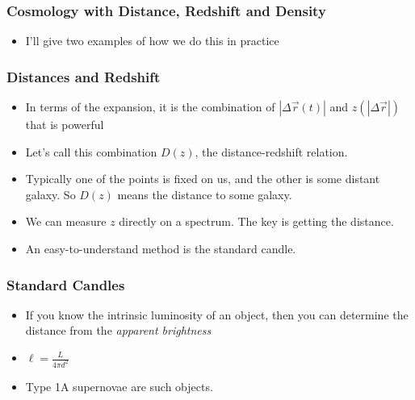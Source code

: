 \documentclass{beamer}
\begin{document}
\frame
{

    \frametitle{Cosmology with Distance, Redshift and Density}


    \begin{itemize}

        \item I'll give two examples of how we do this in practice


    \end{itemize}

}



\frame
{

    \frametitle{Distances and Redshift}


    \begin{itemize}

        \item In terms of the expansion, it is the combination of {\color{gold}
            $|\Delta \vec{r} (t)| $ } and {\color{gold} $z(|\Delta \vec{r}|)$}
            that is powerful


        \item Let's call this combination  {\color{gold} $D(z)$}, the distance-redshift
            relation.

        \item Typically one of the points is fixed on us, and the other is
            some distant galaxy. So {\color{gold} $D(z)$} means the distance
            to some galaxy.

        \item We can measure $z$ directly on a spectrum.  The key is getting
            the distance.

        \item An easy-to-understand method is the standard candle.

    \end{itemize}

}

\frame
{

    \frametitle{Standard Candles}


    \begin{itemize}

        \item If you know the intrinsic luminosity of an object, then you can
            determine the distance from the {\em apparent brightness}

        \item {\color{gold} $\ell = \frac{L}{4 \pi d^2}$ }

        \item Type 1A supernovae are such objects.

    \end{itemize}

}
\end{document}
